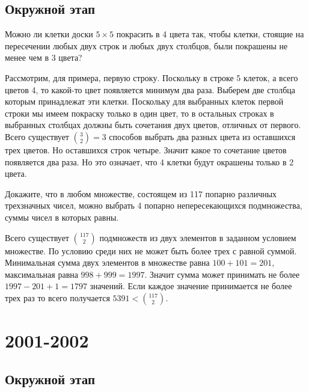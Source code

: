 \documentclass[11pt, a4paper]{common/document_template}
\begin{document}
\section{Окружной этап}

\begin{exercise}
Можно ли клетки доски $5 \times 5$ покрасить в 4 цвета так, чтобы клетки,
стоящие на пересечении любых двух строк и любых двух столбцов, были
покрашены не менее чем в 3 цвета?
\end{exercise}

\begin{Solution}
Рассмотрим, для примера, первую строку. Поскольку в строке 5 клеток, а всего цветов 4, то какой-то цвет появляется минимум два раза. Выберем две столбца которым принадлежат эти клетки. Поскольку для выбранных клеток первой строки мы имеем покраску только в один цвет, то в остальных строках в выбранных столбцах должны быть сочетания двух цветов, отличных от первого. Всего существует $\binom{3}{2} = 3$ способов выбрать два разных цвета из оставшихся трех цветов. Но оставшихся строк четыре. Значит какое то сочетание цветов появляется два раза. Но это означает, что 4 клетки будут окрашены только в 2 цвета.  
\end{Solution}

\begin{exercise}
Докажите, что в любом множестве, состоящем из 117 попарно различных трехзначных чисел, можно выбрать 4 попарно непересекающихся подмножества, суммы чисел в которых равны.
\end{exercise}

\begin{Solution}
Всего существует $\binom{117}{2}$ подмножеств из двух элементов в заданном условием множестве. По условию среди них не может быть более трех с равной суммой. Минимальная сумма двух элементов в множестве равна $100 + 101 = 201$, максимальная равна $998 + 999 = 1997$. Значит сумма может принимать не более $1997 - 201 + 1 = 1797$ значений. Если каждое значение принимается не более трех раз то всего получается $5391 < \binom{117}{2}$.
\end{Solution}

\chapter{2001-2002}

\section{Окружной этап}
\end{document}
